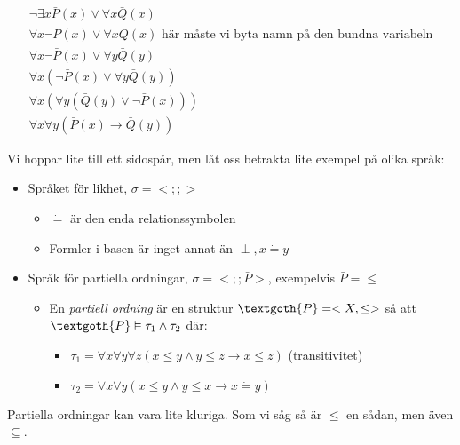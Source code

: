 \begin{equation*}
  \begin{gathered}
    \neg\exists x\bar{P}(x)\vee\forall x \bar{Q}(x)\\
    \forall x\neg\bar{P}(x)\vee\forall x\bar{Q}(x)\text{ här måste vi byta namn på den bundna variabeln}\\
    \forall x \neg\bar{P}(x)\vee\forall y\bar{Q}(y)\\
    \forall x\left(\neg\bar{P}(x)\vee\forall y\bar{Q}(y)\right)\\
    \forall x\left(\forall y\left(\bar{Q}(y)\vee\neg\bar{P}(x)\right)\right)\\
    \forall x\forall y\left(\bar{P}(x)\rightarrow\bar{Q}(y)\right)
  \end{gathered}
\end{equation*}
\par\bigskip
\noindent Vi hoppar lite till ett sidospår, men låt oss betrakta lite exempel på olika språk:
\begin{itemize}
  \item Språket för likhet, $\sigma=<;;>$
    \begin{itemize}
      \item$\dot{=}$ är den enda relationssymbolen
      \item Formler i basen är inget annat än $\perp, x\dot{=}y$
    \end{itemize}
  \item Språk för partiella ordningar, $\sigma=<;;\bar{P}>$, exempelvis $\bar{P}=\leq$
    \begin{itemize}
      \item En \textit{partiell ordning} är en struktur $\textgoth{P}=<X,\leq>$ så att $\textgoth{P}\vDash\tau_1\wedge\tau_2$ där:
        \begin{itemize}
          \item $\tau_1 = \forall x \forall y \forall z\left(x\leq y\wedge y\leq z\rightarrow x\leq z\right)$ (transitivitet)
          \item $\tau_2 = \forall x \forall y\left(x\leq y\wedge y\leq x\rightarrow x\dot{=}y\right)$
        \end{itemize}
    \end{itemize}
\end{itemize}
\par\bigskip
\noindent Partiella ordningar kan vara lite kluriga. Som vi såg så är $\leq$ en sådan, men även $\subseteq$.
